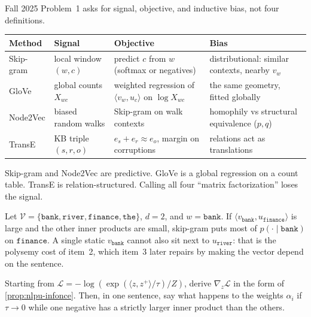 \begin{remark}
\label{rem:nlpu-four-emb}
Fall 2025 Problem~1 asks for signal, objective, and inductive bias, not four definitions.
\begin{center}
\small
\begin{tabular}{|l|p{}|p{}|p{}|}
\hline
\textbf{Method} & \textbf{Signal} & \textbf{Objective} & \textbf{Bias} \\ \hline
Skip-gram & local window $(w,c)$ & predict $c$ from $w$ (softmax or negatives) & distributional: similar contexts, nearby $v_w$ \\ \hline
GloVe & global counts $X_{wc}$ & weighted regression of $\langle v_w,u_c\rangle$ on $\log X_{wc}$ & the same geometry, fitted globally \\ \hline
Node2Vec & biased random walks & Skip-gram on walk contexts & homophily vs structural equivalence ($p,q$) \\ \hline
TransE & KB triple $(s,r,o)$ & $e_s+e_r\approx e_o$, margin on corruptions & relations act as translations \\ \hline
\end{tabular}
\end{center}
Skip-gram and Node2Vec are predictive. GloVe is a global regression on a count table. TransE is relation-structured. Calling all four ``matrix factorization'' loses the signal.
\end{remark}

\begin{example}
\label{exmp:nlpu-skip-tiny}
Let $\mathcal{V}=\{\texttt{bank},\texttt{river},\texttt{finance},\texttt{the}\}$, $d=2$, and $w=\texttt{bank}$. If $\langle v_{\texttt{bank}},u_{\texttt{finance}}\rangle$ is large and the other inner products are small, skip-gram puts most of $p(\cdot\mid\texttt{bank})$ on $\texttt{finance}$. A single static $v_{\texttt{bank}}$ cannot also sit next to $u_{\texttt{river}}$: that is the polysemy cost of item~2, which item~3 later repairs by making the vector depend on the sentence.
\end{example}

\begin{exercise}
\label{ex:nlpu-infonce-grad}
Starting from $\mathcal{L}=-\log(\exp(\langle z,z^+\rangle/\tau)/Z)$, derive $\nabla_z\mathcal{L}$ in the form of \cref{prop:nlpu-infonce}. Then, in one sentence, say what happens to the weights $\alpha_i$ if $\tau\to 0$ while one negative has a strictly larger inner product than the others.
\end{exercise}

